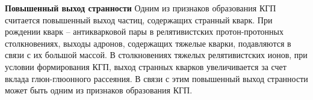 
\textbf{Повышенный выход странности}
Одним из признаков образования КГП считается повышенный выход частиц, содержащих странный кварк. При рождении кварк – антикварковой пары в релятивистских протон-протонных столкновениях, выходы адронов, содержащих тяжелые кварки, подавляются в связи с их большой массой. В столкновениях тяжелых релятивистских ионов, при условии формирования КГП, выход странных кварков увеличивается за счет вклада глюн-глюонного рассеяния. В связи с этим повышенный выход странности может быть одним из признаков образования КГП. 

